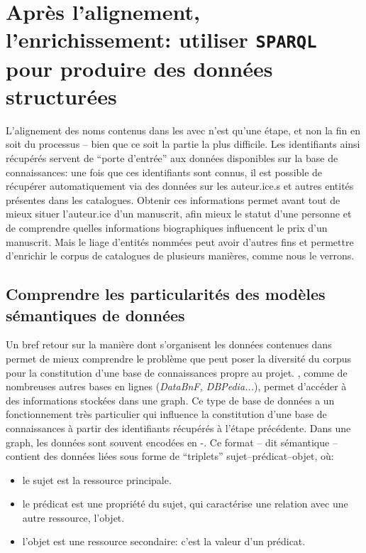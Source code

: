 \chapter{Après l'alignement, l'enrichissement: utiliser \texttt{SPARQL} pour produire des données structurées}
L'alignement des noms contenus dans les \tname{} avec \wkd{} n'est qu'une étape, et non la fin en soit du processus -- bien que ce soit la partie la plus difficile. Les identifiants ainsi récupérés servent de \enquote{porte d'entrée} aux données disponibles sur la base de connaissances: une fois que ces identifiants sont connus, il est possible de récupérer automatiquement via \sparql{} des données sur les auteur.ice.s et autres entités présentes dans les catalogues. Obtenir ces informations permet avant tout de mieux situer l'auteur.ice d'un manuscrit, afin mieux le statut d'une personne et de comprendre quelles informations biographiques influencent le prix d'un manuscrit. Mais le liage d'entités nommées peut avoir d'autres fins et permettre d'enrichir le corpus de catalogues de plusieurs manières, comme nous le verrons.

\section{Comprendre les particularités des modèles sémantiques de données}
Un bref retour sur la manière dont s'organisent les données contenues dans \wkd{} permet de mieux comprendre le problème que peut poser la diversité du corpus pour la constitution d'une base de connaissances propre au projet. \wkd{}, comme de nombreuses autres bases en lignes (\textit{DataBnF, DBPedia...}), permet d'accéder à des informations stockées dans une \gls{graph}. Ce type de base de données a un fonctionnement très particulier qui influence la constitution d'une base de connaissances à partir des identifiants \wkd{} récupérés à l'étape précédente. Dans une \gls{graph}, les données sont souvent encodées en \xml{}-\rdf{}. Ce format -- dit sémantique -- contient des données liées sous forme de \enquote{triplets} sujet--prédicat--objet, où:

\begin{itemize}
	\item le sujet est la ressource principale.
	\item le prédicat est une propriété du sujet, qui caractérise une relation avec une autre ressource, l'objet.
	\item l'objet est une ressource secondaire: c'est la valeur d'un prédicat.
\end{itemize}

